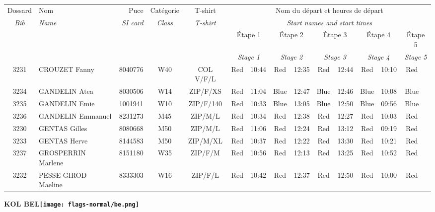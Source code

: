 \documentclass{report}
\begin{document}
  \begin{longtable}{|c|l|r|c|c|*{5}{cc|}}
    Dossard & Nom  & Puce    & Catégorie & T-shirt & \multicolumn{10}{c|}{Nom du départ et heures de départ} \\
    \itshape Bib     & \itshape Name & \itshape SI card & \itshape Class  & \itshape  T-shirt  & \multicolumn{10}{c|}{\itshape Start names and start times} \\
    \hline
    & & & & & \multicolumn{2}{c|}{Étape 1} & \multicolumn{2}{c|}{Étape 2} & \multicolumn{2}{c|}{Étape 3} & \multicolumn{2}{c|}{Étape 4} & \multicolumn{2}{c|}{Étape 5} \\
    & & & & & \multicolumn{2}{c|}{\itshape Stage 1} & \multicolumn{2}{c|}{\itshape Stage 2} & \multicolumn{2}{c|}{\itshape Stage 3} & \multicolumn{2}{c|}{\itshape Stage 4} & \multicolumn{2}{c|}{\itshape Stage 5} \\
    \hline
    3231 & CROUZET Fanny & 8040776 & W40 & COL V/F/L & Red & 10:44 & Red & 12:35 & Red & 12:44 & Red & 10:10 & Red &  \\
    3234 & GANDELIN Atea & 8030506 & W14 & ZIP/F/XS & Red & 11:04 & Blue & 12:47 & Blue & 12:46 & Blue & 10:08 & Blue &  \\
    3235 & GANDELIN Emie & 1001941 & W10 & ZIP/F/140 & Red & 10:33 & Blue & 13:05 & Blue & 12:50 & Blue & 09:56 & Blue &  \\
    3236 & GANDELIN Emmanuel & 8231273 & M45 & ZIP/M/L & Red & 10:34 & Red & 12:38 & Red & 12:27 & Red & 10:03 & Red &  \\
    3230 & GENTAS Gilles & 8080668 & M50 & ZIP/M/L & Red & 11:06 & Red & 12:24 & Red & 13:12 & Red & 09:19 & Red &  \\
    3233 & GENTAS Herve & 8144583 & M50 & ZIP/M/XL & Red & 10:37 & Red & 12:22 & Red & 13:30 & Red & 10:21 & Red &  \\
    3237 & GROSPERRIN Marlene & 8151180 & W35 & ZIP/F/M & Red & 10:56 & Red & 12:13 & Red & 13:25 & Red & 10:52 & Red &  \\
    3232 & PESSE GIROD Maeline & 8333303 & W16 & ZIP/F/L & Red & 10:42 & Red & 12:37 & Red & 12:50 & Red & 10:00 & Red &  \\
  \end{longtable}
\newpage
  \Huge \centering \bfseries KOL  BEL\normalfont \footnotesize \sffamily \hfill \texttt{[image: flags-normal/be.png]} \newline 
\end{document}
